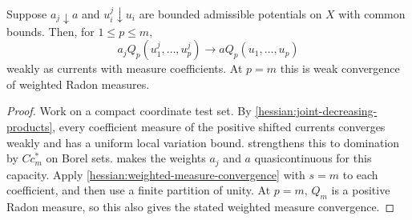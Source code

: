 \begin{theorem}\label{hessian:weighted-positive-products}
Suppose $a_j\downarrow a$ and $u_i^j\downarrow u_i$ are bounded
admissible potentials on $X$ with common bounds. Then,
for $1\leq p\leq m$,
\[
 a_j Q_p(u_1^j,\ldots,u_p^j)
        \longrightarrow a Q_p(u_1,\ldots,u_p)
\]
weakly as currents with measure coefficients. At $p=m$ this is weak
convergence of weighted Radon measures.
\end{theorem}
\begin{proof}
Work on a compact coordinate test set. By
\cref{hessian:joint-decreasing-products}, every coefficient measure
of the positive shifted currents converges weakly and has a uniform
local variation bound. 
strengthens this to domination by $C c_m^*$ on Borel sets.
 makes the weights
$a_j$ and $a$ quasicontinuous for this capacity. Apply
\cref{hessian:weighted-measure-convergence} with $s=m$ to each
coefficient, and then use a finite partition of unity. At $p=m$,
$Q_m$ is a positive Radon measure, so this also gives the stated
weighted measure convergence.
\end{proof}
